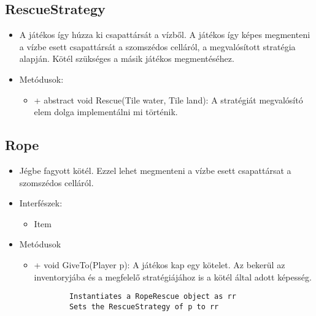 \subsection{RescueStrategy}
\begin{itemize}
	\item A játékos így húzza ki csapattársát a vízből. A játékos így képes megmenteni a vízbe esett csapattársát a szomszédos celláról, a megvalósított stratégia alapján. Kötél szükséges a másik játékos megmentéséhez.
	\item Metódusok:
	\begin{itemize}
		\item + abstract void Rescue(Tile water, Tile land): A stratégiát megvalósító elem dolga implementálni mi történik.
	\end{itemize}
\end{itemize}

\subsection{Rope}
\begin{itemize}
	\item Jégbe fagyott kötél. Ezzel lehet megmenteni a vízbe esett csapattársat a szomszédos celláról.
	\item Interfészek:
	\begin{itemize}
		\item Item
	\end{itemize}
	\item Metódusok
	\begin{itemize}
		\item + void GiveTo(Player p): A játékos kap egy kötelet. Az bekerül az inventoryjába és a megfelelő stratégiájához is a kötél által adott képesség.
		\begin{lstlisting}
		Instantiates a RopeRescue object as rr
		Sets the RescueStrategy of p to rr
		\end{lstlisting}
	\end{itemize}
\end{itemize}

